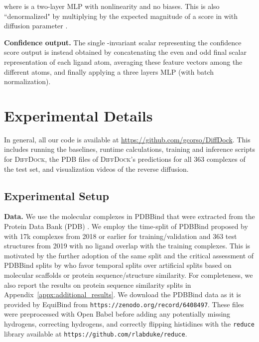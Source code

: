 \documentclass{article} \usepackage{iclr2023_conference,times}
\newcommand{\new}[1]{#1}
\begin{document}
where  is a two-layer MLP with  nonlinearity and no biases. This is also ``denormalized" by multiplying by the expected magnitude of a score in  with diffusion parameter .

\textbf{Confidence output.} The single -invariant scalar representing the confidence score output is instead obtained by concatenating the even and odd final scalar representation of each ligand atom, averaging these feature vectors among the different atoms, and finally applying a three layers MLP (with batch normalization). 


\section{Experimental Details} \label{app:exp_details}
In general, all our code is available at \url{https://github.com/gcorso/DiffDock}. This includes running the baselines, runtime calculations, training and inference scripts for \textsc{DiffDock}, the PDB files of \textsc{DiffDock}'s predictions for all 363 complexes of the test set, and visualization videos of the reverse diffusion.

\subsection{Experimental Setup} \label{appx:experimental_setup}
\textbf{Data.} We use the molecular complexes in PDBBind \citep{liu2017PDBBind} that were extracted from the Protein Data Bank (PDB) \citep{berman2003PDB}. We employ the time-split of PDBBind proposed by \citet{equibind} with 17k complexes from 2018 or earlier for training/validation and 363 test structures from 2019 with no ligand overlap with the training complexes. This is motivated by the further adoption of the same split \citep{Lu2022TankBind} and the critical assessment of PDBBind splits by \citet{Volkov2022PDBBindSplits} who favor temporal splits over artificial splits based on molecular scaffolds or protein sequence/structure similarity. For completeness, we also report the results on protein sequence similarity splits in Appendix~\ref{appx:additional_results}. \new{We download the PDBBind data as it is provided by EquiBind from \texttt{https://zenodo.org/record/6408497}. These files were preprocessed with Open Babel before adding any potentially missing hydrogens, correcting hydrogens, and correctly flipping histidines with the \texttt{reduce} library available at \texttt{https://github.com/rlabduke/reduce}.}
\end{document}
